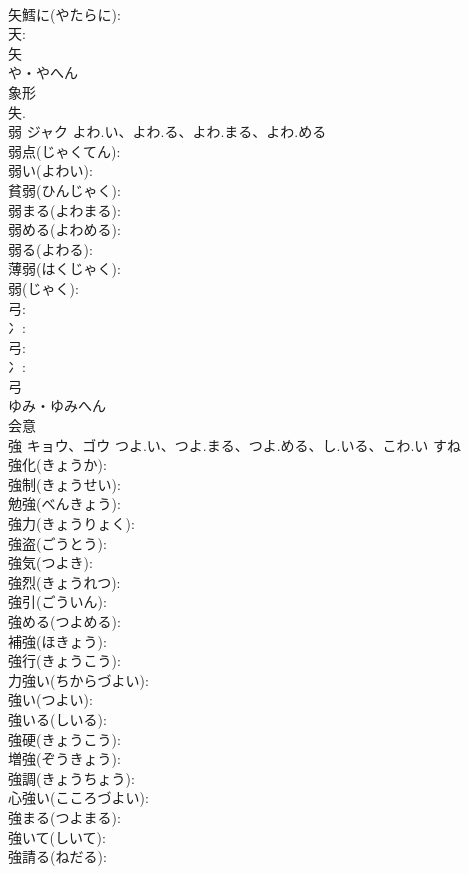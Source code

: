 \documentclass[8pt]{extreport}
\begin{document}
\begin{CJK}{UTF8}{min}
\\	矢鱈に(やたらに): 
\\	天: 
\\	矢	
\\	や・やへん	
\\	象形 
\\	失.
\\	弱	ジャク	よわ.い、よわ.る、よわ.まる、よわ.める		
\\	弱点(じゃくてん): 
\\	弱い(よわい): 
\\	貧弱(ひんじゃく): 
\\	弱まる(よわまる): 
\\	弱める(よわめる): 
\\	弱る(よわる): 
\\	薄弱(はくじゃく): 
\\	弱(じゃく): 
\\	弓: 
\\	冫: 
\\	弓: 
\\	冫: 
\\	弓	
\\	ゆみ・ゆみへん	
\\	会意 
\\	強	キョウ、ゴウ	つよ.い、つよ.まる、つよ.める、し.いる、こわ.い	すね	
\\	強化(きょうか): 
\\	強制(きょうせい): 
\\	勉強(べんきょう): 
\\	強力(きょうりょく): 
\\	強盗(ごうとう): 
\\	強気(つよき): 
\\	強烈(きょうれつ): 
\\	強引(ごういん): 
\\	強める(つよめる): 
\\	補強(ほきょう): 
\\	強行(きょうこう): 
\\	力強い(ちからづよい): 
\\	強い(つよい): 
\\	強いる(しいる): 
\\	強硬(きょうこう): 
\\	増強(ぞうきょう): 
\\	強調(きょうちょう): 
\\	心強い(こころづよい): 
\\	強まる(つよまる): 
\\	強いて(しいて): 
\\	強請る(ねだる): 

\end{CJK}
\end{document}
